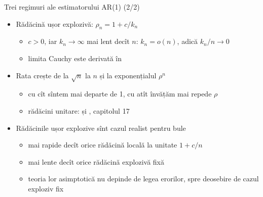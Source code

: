 \begin{frame}{Trei regimuri ale estimatorului AR(1) (2/2)}
\itemsize{\small}
\begin{itemize}
    \item Rădăcină ușor explozivă: $\rho_n = 1 + c/k_n$
    \begin{itemize}
        \item $c > 0$, iar $k_n \to \infty$ mai lent decît $n$: $k_n = o(n)$, adică $k_n/n \to 0$
        \item limita Cauchy este derivată în  %
    \end{itemize}
    \item Rata crește de la $\sqrt n$ la $n$ și la exponențialul $\rho^n$
    \begin{itemize}
        \item cu cît sîntem mai departe de 1, cu atît învățăm mai repede $\rho$
        \item rădăcini unitare:  și , capitolul 17
    \end{itemize}
    \item Rădăcinile ușor explozive sînt cazul realist pentru bule
    \begin{itemize}
        \item mai rapide decît orice rădăcină locală la unitate $1 + c/n$
        \item mai lente decît orice rădăcină explozivă fixă
        \item teoria lor asimptotică nu depinde de legea erorilor, spre deosebire de cazul exploziv fix
    \end{itemize}
\end{itemize}
\end{frame}

